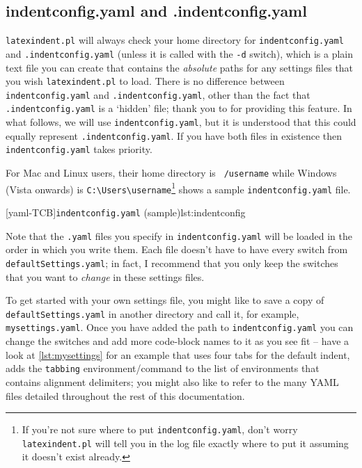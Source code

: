 \documentclass[10pt]{article}
\begin{document}
\subsection{indentconfig.yaml and .indentconfig.yaml}\label{subsec:indentconfig}
 \texttt{latexindent.pl} will always check your home directory for
 \texttt{indentconfig.yaml}
 and \texttt{.indentconfig.yaml} (unless it is called with the \texttt{-d} switch), which
 is a plain text file you can create that contains the \emph{absolute} paths for any
 settings files that you wish \texttt{latexindent.pl} to load. There is no difference
 between \texttt{indentconfig.yaml} and \texttt{.indentconfig.yaml}, other than the fact
 that \texttt{.indentconfig.yaml} is a `hidden' file; thank you to
 \cite{jacobo-diaz-hidden-config} for providing this feature. In what follows, we will use
 \texttt{indentconfig.yaml}, but it is understood that this could equally represent
 \texttt{.indentconfig.yaml}. If you have both files in existence then
 \texttt{indentconfig.yaml} takes priority.

 For Mac and Linux users, their home directory is \texttt{~/username} while Windows
 (Vista onwards) is \lstinline!C:\Users\username!\footnote{If you're not sure where to
 put \texttt{indentconfig.yaml}, don't worry \texttt{latexindent.pl} will tell you in the
 log file exactly where to put it assuming it doesn't exist already.}
  shows a sample \texttt{indentconfig.yaml} file.

 [yaml-TCB]{\texttt{indentconfig.yaml} (sample)}{lst:indentconfig}

 Note that the \texttt{.yaml} files you specify in \texttt{indentconfig.yaml} will be
 loaded in the order in which you write them. Each file doesn't have to have every switch
 from \texttt{defaultSettings.yaml}; in fact, I recommend that you only keep the switches
 that you want to \emph{change} in these settings files.

 To get started with your own settings file, you might like to save a copy of
 \texttt{defaultSettings.yaml} in another directory and call it, for example,
 \texttt{mysettings.yaml}. Once you have added the path to \texttt{indentconfig.yaml} you
 can change the switches and add more code-block names to it as you see fit -- have a
 look at \cref{lst:mysettings} for an example that uses four tabs for the default indent,
 adds the \texttt{tabbing} environment/command to the list of environments that contains
 alignment delimiters; you might also like to refer to the many YAML files detailed
 throughout the rest of this documentation. 
\end{document}

